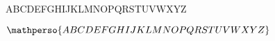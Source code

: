 \documentclass[varwidth, border = 3pt]{standalone}
\begin{document}
ABCDEFGHIJKLMNOPQRSTUVWXYZ

$\mathperso{ABCDEFGHIJKLMNOPQRSTUVWXYZ}$
\end{document}
